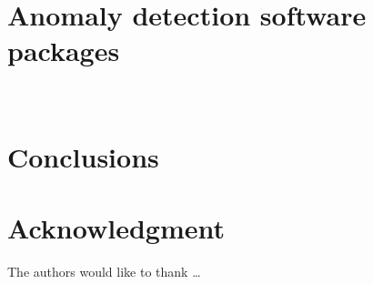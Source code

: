 \subsection{}


\section{Anomaly detection software packages}~\label{sec:tools}


\section{Conclusions} \label{sec-conclusions}

\blindtext

\section*{Acknowledgment}

\lipsum[1]


The authors would like to thank \ldots


